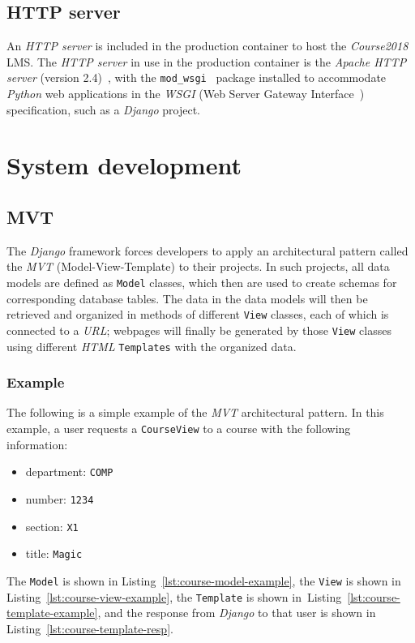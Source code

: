 \subsection{HTTP server}
An \emph{HTTP server} is included in the production container to host the
\emph{Course2018} LMS.
The \emph{HTTP server} in use in the production container is the
\emph{Apache HTTP server} (version 2.4)~\cite{apache}, with the
\texttt{mod\_wsgi}~\cite{wsgi} package installed to accommodate
\emph{Python} web applications in the \emph{WSGI}
(Web Server Gateway Interface~\cite{wsgi}) specification, such as a
\emph{Django} project.

\section{System development}

\subsection{MVT}
\label{sec:MVT}
The \emph{Django} framework forces developers to apply an architectural
pattern called the \emph{MVT} (Model-View-Template) to their projects.
In such projects,
all data models are defined as \texttt{Model} classes, which
then are used to create schemas for corresponding database tables.
The data in the data models will then be retrieved and organized in 
methods of different \texttt{View} classes, each of which 
is connected to a \emph{URL};
webpages will finally be generated by those \texttt{View} classes
using different \emph{HTML} \texttt{Templates} with the organized data.

\subsubsection{Example}
\label{sec:MVT-EXAMPLE}
The following is a simple example of the \emph{MVT} architectural pattern.
In this example, a user requests a \texttt{CourseView} to a course with the
following information:
\begin{itemize}
    \item department: \texttt{COMP}
    \item number: \texttt{1234}
    \item section: \texttt{X1}
    \item title: \texttt{Magic}
\end{itemize}

The \texttt{Model} is shown in Listing~\ref{lst:course-model-example},
the \texttt{View} is shown in Listing~\ref{lst:course-view-example},
the \texttt{Template} is shown in~Listing~\ref{lst:course-template-example},
and the response from \emph{Django} to that user is shown in
Listing~\ref{lst:course-template-resp}.

